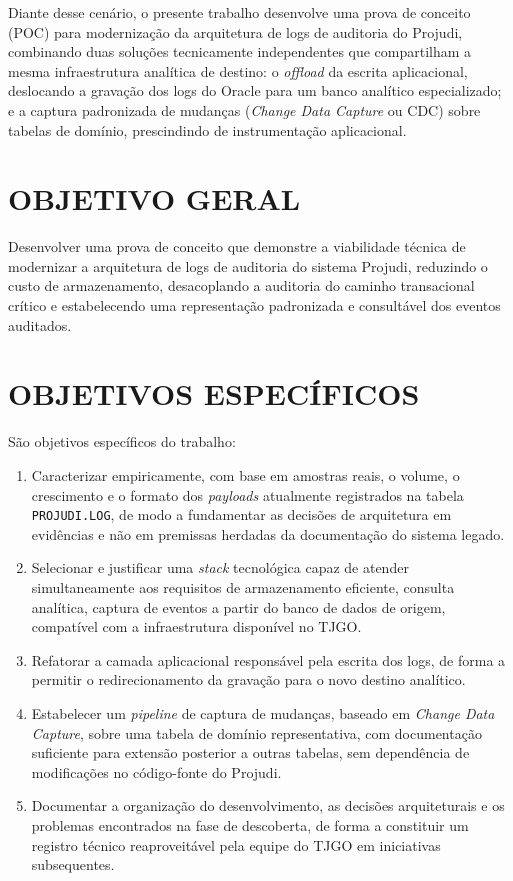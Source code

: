 \documentclass[12pt,letterpaper,oneside]{report}
\begin{document}
Diante desse cenário, o presente trabalho desenvolve uma prova de conceito (POC) para modernização da arquitetura de logs de auditoria do Projudi, combinando duas soluções tecnicamente independentes que compartilham a mesma infraestrutura analítica de destino: o \textit{offload} da escrita aplicacional, deslocando a gravação dos logs do Oracle para um banco analítico especializado; e a captura padronizada de mudanças (\textit{Change Data Capture} ou CDC) sobre tabelas de domínio, prescindindo de instrumentação aplicacional.

\section{OBJETIVO GERAL}

Desenvolver uma prova de conceito que demonstre a viabilidade técnica de modernizar a arquitetura de logs de auditoria do sistema Projudi, reduzindo o custo de armazenamento, desacoplando a auditoria do caminho transacional crítico e estabelecendo uma representação padronizada e consultável dos eventos auditados.

\section{OBJETIVOS ESPECÍFICOS}

São objetivos específicos do trabalho:

\begin{enumerate}
  \item Caracterizar empiricamente, com base em amostras reais, o volume, o crescimento e o formato dos \textit{payloads} atualmente registrados na tabela \texttt{PROJUDI.LOG}, de modo a fundamentar as decisões de arquitetura em evidências e não em premissas herdadas da documentação do sistema legado.
  \item Selecionar e justificar uma \textit{stack} tecnológica capaz de atender simultaneamente aos requisitos de armazenamento eficiente, consulta analítica, captura de eventos a partir do banco de dados de origem, compatível com a infraestrutura disponível no TJGO.
  \item Refatorar a camada aplicacional responsável pela escrita dos logs, de forma a permitir o redirecionamento da gravação para o novo destino analítico.
  \item Estabelecer um \textit{pipeline} de captura de mudanças, baseado em \textit{Change Data Capture}, sobre uma tabela de domínio representativa, com documentação suficiente para extensão posterior a outras tabelas, sem dependência de modificações no código-fonte do Projudi.
  \item Documentar a organização do desenvolvimento, as decisões arquiteturais e os problemas encontrados na fase de descoberta, de forma a constituir um registro técnico reaproveitável pela equipe do TJGO em iniciativas subsequentes.
\end{enumerate}
\end{document}
